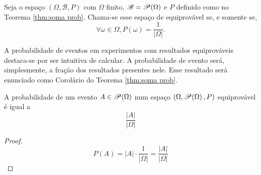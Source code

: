 \begin{def:evento equiprovavel}
Seja o espaço $(\Omega, \mathcal{B}, P)$ com $\Omega$ finito, $\mathcal{B} = \mathcal{P}\!\left(\Omega\right)$
e $P$ definido como no Teorema \ref{thm:soma prob}.
Chama-se esse espaço de equiprovável se, e somente se,
\[
	\forall \omega \in \Omega, P(\omega) = \frac{1}{|\Omega|}.
\]
\end{def:evento equiprovavel}

A probabilidade de eventos em experimentos com resultados equiprováveis destaca-se
por ser intuitiva de calcular. A probabilidade de evento será, simplesmente, a
fração dos resultados presentes nele. Esse resultado será enunciado como Corolário
do Teorema \ref{thm:soma prob}.

\begin{cor:equiprovavel}
\label{prop:equiprovavel}
A probabilidade de um evento $A \in \mathcal{P}\!\left(\Omega\right)$ num espaço $(\Omega, \mathcal{P}\!\left(\Omega\right), P)$
equiprovável é igual a
\[
	\frac{|A|}{|\Omega|}
\]
\begin{proof}
	\[
		P(A) = |A| \cdot \frac{1}{|\Omega|} = \frac{|A|}{|\Omega|}
	\]
\end{proof}
\end{cor:equiprovavel}
